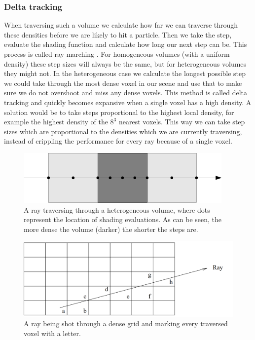 \subsubsection{Delta tracking} \label{related_work:path_traced_volume_rendering:delta_tracking}
When traversing such a volume we calculate how far we can traverse through these densities before we are likely to hit a particle. Then we take the step, evaluate the shading function and calculate how long our next step can be. This process is called ray marching \cite{RenderingWithTwoTriangles}. For homogeneous volumes (with a uniform density) these step sizes will always be the same, but for heterogeneous volumes they might not. In the heterogeneous case we calculate the longest possible step we could take through the most dense voxel in our scene and use that to make sure we do not overshoot and miss any dense voxels. This method is called delta tracking \cite{kutz2017spectral} and quickly becomes expansive when a single voxel has a high density. A solution would be to take steps proportional to the highest local density, for example the highest density of the $8^3$ nearest voxels. This way we can take step sizes which are proportional to the densities which we are currently traversing, instead of crippling the performance for every ray because of a single voxel.

\begin{figure}[H]
    \centering
    \includegraphics[width=0.9\linewidth]{figures/sample_step_size.png}
    \caption{A ray traversing through a heterogeneous volume, where dots represent the location of shading evaluations. As can be seen, the more dense the volume (darker) the shorter the steps are.}
    \label{fig:sample_step_size}
\end{figure}

\begin{figure}
    \centering
    \includegraphics[width=\linewidth]{figures/dda.png}
    \caption{A ray being shot through a dense grid and marking every traversed voxel with a letter. \cite{amanatides1987fast}}
    \label{fig:dda_traversal}
\end{figure}

